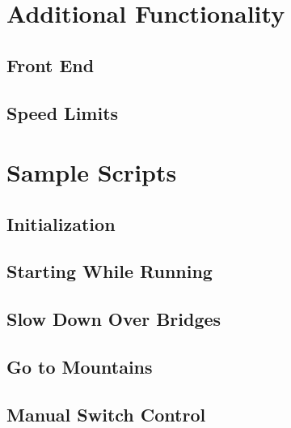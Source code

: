 \documentclass[a4paper,11pt,notitlepage]{article}
\begin{document}
\section{Additional Functionality}
\subsection{Front End}
\subsection{Speed Limits}

\section{Sample Scripts}
\subsection{Initialization}
\subsection{Starting While Running}
\subsection{Slow Down Over Bridges}
\subsection{Go to Mountains}
\subsection{Manual Switch Control}
\end{document}
